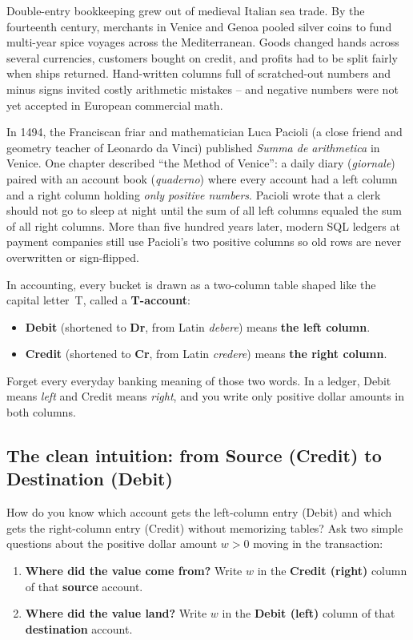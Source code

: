 \begin{historybox}
Double-entry bookkeeping grew out of medieval Italian sea trade. By the fourteenth century, merchants in Venice and Genoa pooled silver coins to fund multi-year spice voyages across the Mediterranean. Goods changed hands across several currencies, customers bought on credit, and profits had to be split fairly when ships returned. Hand-written columns full of scratched-out numbers and minus signs invited costly arithmetic mistakes -- and negative numbers were not yet accepted in European commercial math.

In 1494, the Franciscan friar and mathematician Luca Pacioli (a close friend and geometry teacher of Leonardo da Vinci) published \emph{Summa de arithmetica} in Venice. One chapter described ``the Method of Venice'': a daily diary (\emph{giornale}) paired with an account book (\emph{quaderno}) where every account had a left column and a right column holding \emph{only positive numbers}. Pacioli wrote that a clerk should not go to sleep at night until the sum of all left columns equaled the sum of all right columns. More than five hundred years later, modern SQL ledgers at payment companies still use Pacioli's two positive columns so old rows are never overwritten or sign-flipped.
\end{historybox}

In accounting, every bucket is drawn as a two-column table shaped like the capital letter~T, called a \textbf{T-account}:
\begin{itemize}
  \item \textbf{Debit} (shortened to \textbf{Dr}, from Latin \emph{debere}) means \textbf{the left column}.
  \item \textbf{Credit} (shortened to \textbf{Cr}, from Latin \emph{credere}) means \textbf{the right column}.
\end{itemize}
Forget every everyday banking meaning of those two words. In a ledger, Debit means \emph{left} and Credit means \emph{right}, and you write only positive dollar amounts in both columns.

\subsection*{The clean intuition: from Source (Credit) to Destination (Debit)}

How do you know which account gets the left-column entry (Debit) and which gets the right-column entry (Credit) without memorizing tables? Ask two simple questions about the positive dollar amount $w > 0$ moving in the transaction:
\begin{enumerate}
  \item \textbf{Where did the value come from?} Write $w$ in the \textbf{Credit (right)} column of that \textbf{source} account.
  \item \textbf{Where did the value land?} Write $w$ in the \textbf{Debit (left)} column of that \textbf{destination} account.
\end{enumerate}

